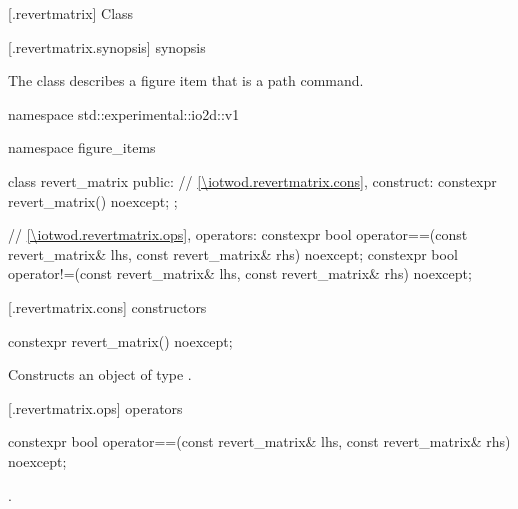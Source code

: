  [\iotwod.revertmatrix] {Class }

 [\iotwod.revertmatrix.synopsis] { synopsis}

\pnum
{}%
The class  describes a figure item that is a path command.

\begin{codeblock}
namespace std::experimental::io2d::v1 {
  namespace figure_items {
    class revert_matrix {
    public:
      // \ref{\iotwod.revertmatrix.cons}, construct:
      constexpr revert_matrix() noexcept;
    };
    
    // \ref{\iotwod.revertmatrix.ops}, operators:
    constexpr bool operator==(const revert_matrix& lhs,
      const revert_matrix& rhs) noexcept;
    constexpr bool operator!=(const revert_matrix& lhs,
      const revert_matrix& rhs) noexcept;
  }
}
\end{codeblock}

 [\iotwod.revertmatrix.cons] { constructors}

%
\begin{itemdecl}
constexpr revert_matrix() noexcept;
\end{itemdecl}
\begin{itemdescr}
\pnum
\effects
Constructs an object of type .
\end{itemdescr}

 [\iotwod.revertmatrix.ops]{ operators}

%
\begin{itemdecl}
constexpr bool operator==(const revert_matrix& lhs, const revert_matrix& rhs) 
  noexcept;
\end{itemdecl}
\begin{itemdescr}
\pnum
\returns
{}.
\end{itemdescr}
